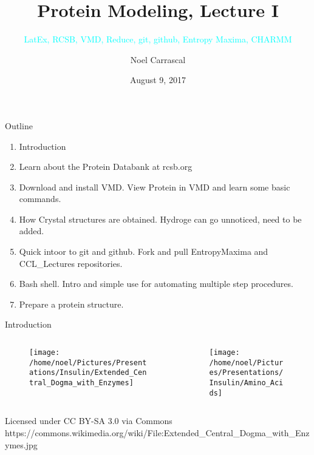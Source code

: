 \documentclass{beamer}
\title{Protein Modeling, Lecture I}
\subtitle{\textcolor{cyan}{\small LatEx, RCSB, VMD, Reduce, git, github, Entropy Maxima, CHARMM}}
\author{Noel Carrascal}
\date{August 9, 2017}
\begin{document}
\maketitle
\begin{frame}{Outline}
   \begin{enumerate}
      \item Introduction
      \item Learn about the Protein Databank at rcsb.org
      \item Download and install VMD. View Protein in VMD and learn some basic commands.
      \item How Crystal structures are obtained. Hydroge can go unnoticed, need to be added.
      \item Quick intoor to git and github. Fork and pull EntropyMaxima and CCL\_Lectures repositories.
      \item Bash shell. Intro and simple use for automating multiple step procedures.
      \item Prepare a protein structure.
   \end{enumerate}
\end{frame}
\begin{frame}{Introduction}
  \begin{columns}
      \begin{column}{0.5\textwidth}
        \begin{figure}
           \texttt{[image: /home/noel/Pictures/Presentations/Insulin/Extended\_Central\_Dogma\_with\_Enzymes]}
        \end{figure}
      \end{column}
      \begin{column}{0.5\textwidth}
        \begin{figure}
           \texttt{[image: /home/noel/Pictures/Presentations/Insulin/Amino\_Acids]}
        \end{figure}
      \end{column}
   \end{columns}
   {\tiny Licensed under CC BY-SA 3.0 via Commons https://commons.wikimedia.org/wiki/File:Extended\_Central\_Dogma\_with\_Enzymes.jpg}
\end{frame}
\end{document}
